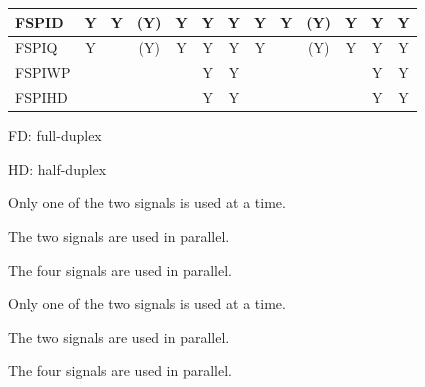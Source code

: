 \documentclass[main\_\_EN.tex]{subfiles}
\begin{document}
\begin{landscape}
\begin{table}[H]
\begin{threeparttable}
\begin{tabular}{ |p{3.0cm} |c|c|c|c|c|c|c|c|c|c|c|c| }
FSPID                    & Y       & Y       & (Y)\tnote{3}      & Y\tnote{4}      & Y\tnote{5}      & Y      & Y       & Y      & (Y)\tnote{6}      & Y\tnote{7}     & Y\tnote{8}     & Y      \\ \hline
FSPIQ                    & Y       &         & (Y)\tnote{3}      & Y\tnote{4}      & Y\tnote{5}      & Y      & Y       &        & (Y)\tnote{6}     & Y\tnote{7}     & Y\tnote{8}      & Y      \\ \hline
FSPIWP                   &         &         &         &         & Y\tnote{5}      & Y      &         &        &         &         & Y\tnote{8}       & Y      \\ \hline
FSPIHD                   &         &         &         &         & Y\tnote{5}      & Y      &         &        &         &         & Y\tnote{8}       & Y      \\ \hline
\end{tabular}

        \begin{tablenotes}
                \item[1] FD: full-duplex
                \item[2] HD: half-duplex
                \item[3] Only one of the two signals is used at a time.
                \item[4] The two signals are used in parallel.
                \item[5] The four signals are used in parallel.
                \item[6] Only one of the two signals is used at a time.
                \item[7] The two signals are used in parallel.
                \item[8] The four signals are used in parallel.
        \end{tablenotes}
     \end{threeparttable}
    \end{table}
\end{landscape}
\end{document}
